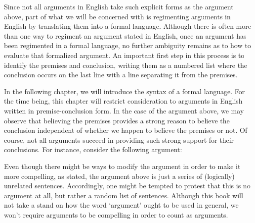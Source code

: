 Since not all arguments in English take such explicit forms as the argument above, part of what we will be concerned with is regimenting arguments in English by translating them into a formal language.
Although there is often more than one way to regiment an argument stated in English, once an argument has been regimented in a formal language, no further ambiguity remains as to how to evaluate that formalized argument.
An important first step in this process is to identify the premises and conclusion, writing them as a numbered list where the conclusion occurs on the last line with a line separating it from the premises.

In the following chapter, we will introduce the syntax of a formal language.
For the time being, this chapter will restrict consideration to arguments in English written in premise-conclusion form.
In the case of the argument above, we may observe that believing the premises provides a strong reason to believe the conclusion independent of whether we happen to believe the premises or not.
Of course, not all arguments succeed in providing such strong support for their conclusions.
For instance, consider the following argument:

\label{argBunk}
\begin{earg}
\end{earg}

Even though there might be ways to modify the argument in order to make it more compelling, as stated, the argument above is just a series of (logically) unrelated sentences.
Accordingly, one might be tempted to protest that this is no argument at all, but rather a random list of sentences.
Although this book will not take a stand on how the word `argument' ought to be used in general, we won't require arguments to be compelling in order to count as arguments.


